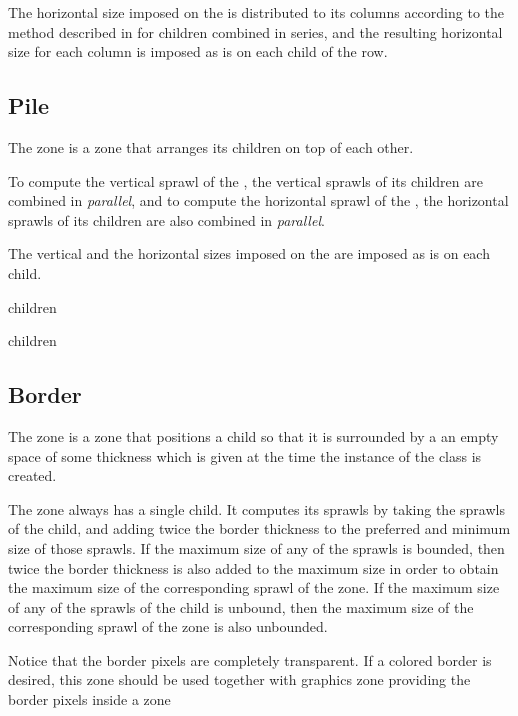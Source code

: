 The horizontal size imposed on the  is distributed to its
columns according to the method described in
 for children combined in
series, and the resulting horizontal size for each column is imposed
as is on each child of the row.

\subsection{Pile}
\label{sec-zones-layout-pile}

The  zone is a zone that arranges its children on top of
each other.

To compute the vertical sprawl of the , the vertical
sprawls of its children are combined in \emph{parallel}, and to
compute the horizontal sprawl of the , the horizontal
sprawls of its children are also combined in \emph{parallel}. 


The vertical and the horizontal sizes imposed on the 
are imposed as is on each child.


 {children}

 {\rest children}

\subsection{Border}
\label{sec-zones-layout-border}

The  zone is a zone that positions a child so that it is
surrounded by a an empty space of some thickness which is given at the
time the instance of the  class is created.

The  zone always has a single child.  It computes its
sprawls by taking the sprawls of the child, and adding twice the border
thickness to the preferred and minimum size of those sprawls.  If the
maximum size of any of the sprawls is bounded, then twice the border
thickness is also added to the maximum size in order to obtain the
maximum size of the corresponding sprawl of the  zone.
If the maximum size of any of the sprawls of the child is unbound,
then the maximum size of the corresponding sprawl of the 
zone is also unbounded.

Notice that the border pixels are completely transparent.  If a
colored border is desired, this zone should be used together with
graphics zone providing the border pixels inside a  zone

